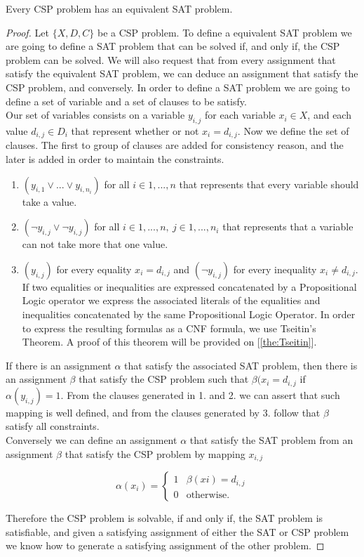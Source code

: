 \begin{proposition}
  Every CSP problem has an equivalent SAT problem.
\end{proposition}
\begin{proof}
  Let $ \{X,D,C\}$ be a CSP problem. To define a equivalent SAT problem we are going to define a SAT problem that can be solved if, and only if, the CSP problem can be solved. We will also request that from every assignment that satisfy the equivalent SAT problem, we can deduce an assignment that satisfy the CSP problem, and conversely. In order to define a SAT problem we are going to define a set of variable and a set of clauses to be satisfy.\\

  Our set of variables consists on a variable $y_{i,j}$ for each variable $x_i\in X$, and each value $d_{i,j}\in D_i$ that represent whether or not $x_i = d_{i,j}$. Now we define the set of clauses. The first to group of clauses are added for consistency reason, and the later is added in order to maintain the constraints.
  \begin{enumerate}
  \item $(y_{i,1}\vee ... \vee y_{i,n_i})$ for all $i\in 1,...,n$ that represents that every variable should take a value.
  \item $(\neg y_{i,j} \vee \neg y_{i,j})$ for all $i\in 1,...,n,\ j\in 1,...,n_i$ that represents that a variable can not take more that one value.
  \item $(y_{i,j})$ for every equality $x_i = d_{i,j}$ and $(\neg y_{i,j})$ for every inequality $x_i \ne d_{i,j}$. If two equalities or inequalities are expressed concatenated by a Propositional Logic operator we express the associated literals of the equalities and inequalities concatenated by the same Propositional Logic Operator. In order to express the resulting formulas as a CNF formula, we use Tseitin's Theorem. A proof of this theorem will be provided on [\ref{the:Tseitin}].
  \end{enumerate}

  If there is an assignment $\alpha$ that satisfy the associated SAT problem, then there is an assignment $\beta$ that satisfy the CSP problem such that $\beta(x_i=d_{i,j}$ if $\alpha(y_{i,j}) = 1$. From the clauses generated in 1. and 2. we can assert that such mapping is well defined, and from the clauses generated by 3. follow that $\beta$ satisfy all constraints.\\

  Conversely we can define an assignment $\alpha$ that satisfy the SAT problem from an assignment $\beta$ that satisfy the CSP problem by mapping $x_{i,j}$ 

$$
\alpha(x_{i})=
\begin{cases}
  1 & \beta(x{i}) = d_{i,j}\\
  0 & \text{otherwise}.
\end{cases}
$$

Therefore the CSP problem is solvable, if and only if, the SAT problem is satisfiable, and given a satisfying assignment of either the SAT or CSP problem we know how to generate a satisfying assignment of the other problem.
\end{proof}

